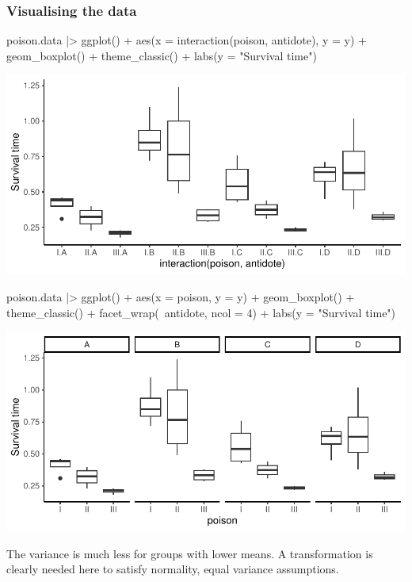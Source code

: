 \documentclass[a4paper]{article}
\begin{document}
\subsubsection{Visualising the data}
\begin{Schunk}
\begin{Sinput}
poison.data |> ggplot() + 
  aes(x = interaction(poison, antidote), y = y) +
  geom_boxplot() + 
  theme_classic() + 
  labs(y = "Survival time")
\end{Sinput}


{\centering \includegraphics[width=\maxwidth]{figure/listings-unnamed-chunk-303-1} 

}

\begin{Sinput}
poison.data |> ggplot() + 
  aes(x = poison, y = y) +
  geom_boxplot() + 
  theme_classic() + 
  facet_wrap(~antidote, ncol = 4) + 
  labs(y = "Survival time")
\end{Sinput}


{\centering \includegraphics[width=\maxwidth]{figure/listings-unnamed-chunk-303-2} 

}

\end{Schunk}
The variance is much less for groups with lower means. A transformation is clearly needed here to satisfy normality, equal variance assumptions.
\end{document}
